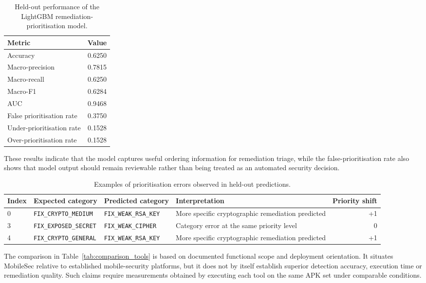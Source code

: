 \begin{table}[H]
\centering
\caption{Held-out performance of the LightGBM remediation-prioritisation model.}
\label{tab:lightgbm-prioritization-generated}
\begin{tabular}{lc}
\toprule
\textbf{Metric} & \textbf{Value} \\
\midrule
Accuracy & 0.6250 \\
Macro-precision & 0.7815 \\
Macro-recall & 0.6250 \\
Macro-F1 & 0.6284 \\
AUC & 0.9468 \\
False prioritisation rate & 0.3750 \\
Under-prioritisation rate & 0.1528 \\
Over-prioritisation rate & 0.1528 \\
\bottomrule
\end{tabular}
\end{table}

These results indicate that the model captures useful ordering information for
remediation triage, while the false-prioritisation rate also shows that model
output should remain reviewable rather than being treated as an automated
security decision.

\begin{table}[!htbp]
\centering
\caption{Examples of prioritisation errors observed in held-out predictions.}
\label{tab:lightgbm-errors}
\begin{tabular}{llllr}
\toprule
\textbf{Index} & \textbf{Expected category} & \textbf{Predicted category}
& \textbf{Interpretation} & \textbf{Priority shift} \\
\midrule
0 & \texttt{FIX\_CRYPTO\_MEDIUM} & \texttt{FIX\_WEAK\_RSA\_KEY}
& More specific cryptographic remediation predicted & +1 \\
3 & \texttt{FIX\_EXPOSED\_SECRET} & \texttt{FIX\_WEAK\_CIPHER}
& Category error at the same priority level & 0 \\
4 & \texttt{FIX\_CRYPTO\_GENERAL} & \texttt{FIX\_WEAK\_RSA\_KEY}
& More specific cryptographic remediation predicted & +1 \\
\bottomrule
\end{tabular}
\end{table}

The comparison in Table~\ref{tab:comparison_tools} is based on documented
functional scope and deployment orientation. It situates MobileSec relative to
established mobile-security platforms, but it does not by itself establish
superior detection accuracy, execution time or remediation quality. Such
claims require measurements obtained by executing each tool on the same APK
set under comparable conditions.

